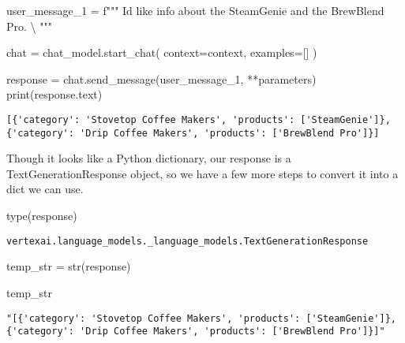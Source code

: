 \documentclass[
  letterpaper,
  DIV=11,
  numbers=noendperiod]{scrreprt}
\newenvironment{Shaded}{\begin{snugshade}}{\end{snugshade}}
\newcommand{\BuiltInTok}[1]{\textcolor[rgb]{0.00,0.23,0.31}{#1}}
\newcommand{\CharTok}[1]{\textcolor[rgb]{0.13,0.47,0.30}{#1}}
\newcommand{\NormalTok}[1]{\textcolor[rgb]{0.00,0.23,0.31}{#1}}
\newcommand{\OperatorTok}[1]{\textcolor[rgb]{0.37,0.37,0.37}{#1}}
\newcommand{\SpecialStringTok}[1]{\textcolor[rgb]{0.13,0.47,0.30}{#1}}
\begin{document}
\begin{Shaded}
\begin{Highlighting}[]
\NormalTok{user\_message\_1 }\OperatorTok{=} \SpecialStringTok{f"""}
\SpecialStringTok{I\textquotesingle{}d like info about the SteamGenie and the BrewBlend Pro. }\CharTok{\textbackslash{}}
\SpecialStringTok{"""}

\NormalTok{chat }\OperatorTok{=}\NormalTok{ chat\_model.start\_chat(}
\NormalTok{    context}\OperatorTok{=}\NormalTok{context,}
\NormalTok{    examples}\OperatorTok{=}\NormalTok{[]}
\NormalTok{)}

\NormalTok{response }\OperatorTok{=}\NormalTok{ chat.send\_message(user\_message\_1, }\OperatorTok{**}\NormalTok{parameters)}
\BuiltInTok{print}\NormalTok{(response.text)}
\end{Highlighting}
\end{Shaded}

\begin{verbatim}
[{'category': 'Stovetop Coffee Makers', 'products': ['SteamGenie']}, {'category': 'Drip Coffee Makers', 'products': ['BrewBlend Pro']}]
\end{verbatim}

Though it looks like a Python dictionary, our response is a
TextGenerationResponse object, so we have a few more steps to convert it
into a dict we can use.

\begin{Shaded}
\begin{Highlighting}[]
\BuiltInTok{type}\NormalTok{(response)}
\end{Highlighting}
\end{Shaded}

\begin{verbatim}
vertexai.language_models._language_models.TextGenerationResponse
\end{verbatim}

\begin{Shaded}
\begin{Highlighting}[]
\NormalTok{temp\_str }\OperatorTok{=} \BuiltInTok{str}\NormalTok{(response)}
\end{Highlighting}
\end{Shaded}

\begin{Shaded}
\begin{Highlighting}[]
\NormalTok{temp\_str}
\end{Highlighting}
\end{Shaded}

\begin{verbatim}
"[{'category': 'Stovetop Coffee Makers', 'products': ['SteamGenie']}, {'category': 'Drip Coffee Makers', 'products': ['BrewBlend Pro']}]"
\end{verbatim}
\end{document}
